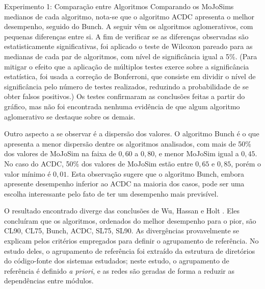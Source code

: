 \begin{section}{Experimento 1: Comparação entre Algoritmos}
Comparando os MoJoSims medianos de cada algoritmo, nota-se que o algoritmo ACDC apresenta o melhor desempenho, seguido do Bunch. A seguir vêm os algoritmos aglomerativos, com pequenas diferenças entre si. A fim de verificar se as diferenças observadas são estatisticamente significativas, foi aplicado o teste de Wilcoxon pareado para as medianas de cada par de algoritmos, com nível de significância igual a 5\%. (Para mitigar o efeito que a aplicação de múltiplos testes exerce sobre a significância estatística, foi usada a correção de Bonferroni, que consiste em dividir o nível de significância pelo número de testes realizados, reduzindo a probabilidade de se obter falsos positivos.) Os testes confirmaram as conclusões feitas a partir do gráfico, mas não foi encontrada nenhuma evidência de que algum algoritmo aglomerativo se destaque sobre os demais.



Outro aspecto a se observar é a dispersão dos valores. O algoritmo Bunch é o que apresenta a menor dispersão dentre os algoritmos analisados, com mais de 50\% dos valores de MoJoSim na faixa de $0,60$ a $0,80$, e menor MoJoSim igual a $0,45$. No caso do ACDC, 50\% dos valores de MoJoSim estão entre $0,65$ e $0,85$, porém o valor mínimo é $0,01$. Esta observação sugere que o algoritmo Bunch, embora apresente desempenho inferior ao ACDC na maioria dos casos, pode ser uma escolha interessante pelo fato de ter um desempenho mais previsível.

O resultado encontrado diverge das conclusões de Wu, Hassan e Holt \cite{Wu2005}. Eles concluíram que os algoritmos, ordenados do melhor desempenho para o pior, são CL90, CL75, Bunch, ACDC, SL75, SL90. As divergências provavelmente se explicam pelos critérios empregados para definir o agrupamento de referência. No estudo deles, o agrupamento de referência foi extraído da estrutura de diretórios do código-fonte dos sistemas estudados; neste estudo, o agrupamento de referência é definido \emph{a priori}, e as redes são geradas de forma a reduzir as dependências entre módulos.


\end{section}
